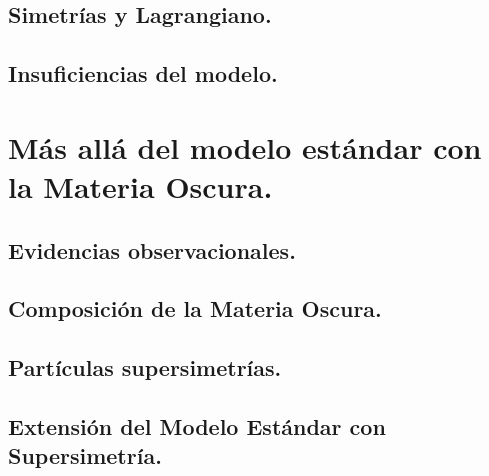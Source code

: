 \documentclass[12pt,english]{report}
\begin{document}
		\subsection{Simetrías y Lagrangiano.} 
		
	
		\subsection{Insuficiencias del modelo.}
		
	
	
	\section{M\'as all\'a del modelo est\'andar con la Materia Oscura.}
	
	
		\subsection{Evidencias observacionales.}
		
		
		
		\subsection{Composición de la Materia Oscura.}
		
		
		\subsection{Partículas supersimetrías.}
		
		
		
		\subsection{Extensión del Modelo Estándar con Supersimetría.}
		
					
\end{document}
